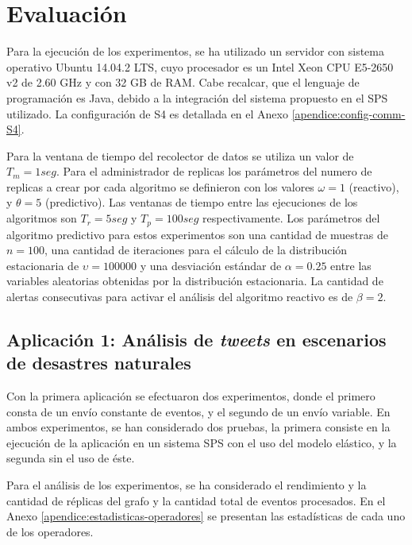 \section{Evaluación}
Para la ejecución de los experimentos, se ha utilizado un servidor con sistema operativo Ubuntu 14.04.2 LTS, cuyo procesador es un Intel Xeon CPU E5-2650 v2 de 2.60 GHz y con 32 GB de RAM. Cabe recalcar, que el lenguaje de programación es Java, debido a la integración del sistema propuesto en el SPS utilizado. La configuración de S4 es detallada en el Anexo \ref{apendice:config-comm-S4}.

Para la ventana de tiempo del recolector de datos se utiliza un valor de $T_m = 1seg$. Para el administrador de replicas los parámetros del numero de replicas a crear por cada algoritmo se definieron con los valores $\omega = 1$ (reactivo), y $\theta = 5$ (predictivo). Las ventanas de tiempo entre las ejecuciones de los algoritmos son $T_r = 5seg$ y $T_p = 100seg$ respectivamente. Los parámetros del algoritmo predictivo para estos experimentos son una cantidad de muestras de $n = 100$, una cantidad de iteraciones para el cálculo de la distribución estacionaria de $\upsilon = 100000$ y una desviación estándar de $\alpha = 0.25$ entre las variables aleatorias obtenidas por la distribución estacionaria. La cantidad de alertas consecutivas para activar el análisis del algoritmo reactivo es de $\beta = 2$.

\subsection{Aplicación 1: Análisis de \textit{tweets} en escenarios de desastres naturales}
Con la primera aplicación se efectuaron dos experimentos, donde el primero consta de un envío constante de eventos, y el segundo de un envío variable. En ambos experimentos, se han considerado dos pruebas, la primera consiste en la ejecución de la aplicación en un sistema SPS con el uso del modelo elástico, y la segunda sin el uso de éste.


Para el análisis de los experimentos, se ha considerado \normalsize{el rendimiento y la cantidad de réplicas del grafo} y la cantidad total de eventos procesados. \normalsize{En el Anexo} \ref{apendice:estadisticas-operadores} \normalsize{se presentan las estadísticas de cada uno de los operadores.}


